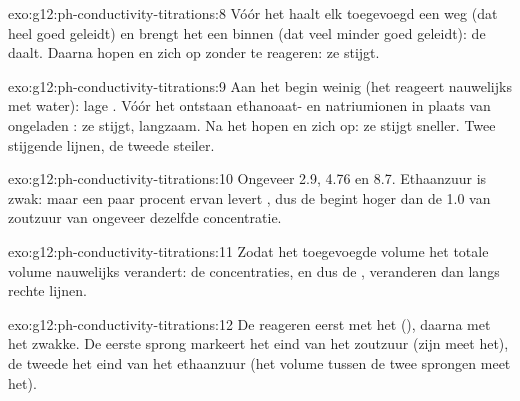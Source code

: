 \begin{solution}{exo:g12:ph-conductivity-titrations:8}
Vóór het  haalt elk toegevoegd  een 
weg (dat heel goed geleidt) en brengt het een  binnen (dat veel
minder goed geleidt): de  daalt. Daarna hopen  en
 zich op zonder te reageren: ze stijgt.
\end{solution}

\begin{solution}{exo:g12:ph-conductivity-titrations:9}
Aan het begin weinig  (het  reageert nauwelijks met
water): lage . Vóór het  ontstaan
ethanoaat- en natriumionen in plaats van ongeladen : ze stijgt,
langzaam. Na het  hopen  en  zich op: ze
stijgt sneller. Twee stijgende lijnen, de tweede steiler.
\end{solution}

\begin{solution}{exo:g12:ph-conductivity-titrations:10}
Ongeveer 2.9, 4.76 en 8.7. Ethaanzuur is zwak: maar een paar procent
ervan levert , dus de  begint hoger dan de 1.0 van zoutzuur
van ongeveer dezelfde concentratie.
\end{solution}

\begin{solution}{exo:g12:ph-conductivity-titrations:11}
Zodat het toegevoegde volume  het totale volume nauwelijks
verandert: de concentraties, en dus de , veranderen dan
langs rechte lijnen.
\end{solution}

\begin{solution}{exo:g12:ph-conductivity-titrations:12}
De  reageren eerst met het  (), daarna
met het zwakke. De eerste sprong markeert het eind van het zoutzuur (zijn
 meet het), de tweede het eind van het ethaanzuur (het
volume tussen de twee sprongen meet het).
\end{solution}

